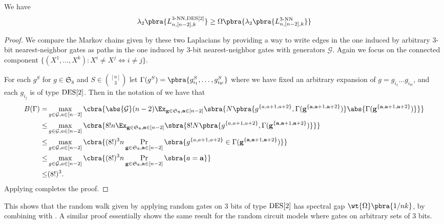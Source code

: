 \begin{lemma}\label{lem:any gate set comparison}
    We have
    \begin{align*}
        \lambda_2\pbra{L_{n,[n-2],k}^{3\text{-NN},\des{2}}}\geq \Omega\pbra{\lambda_2\pbra{L_{n,[n-2],k}^{3\text{-NN}}}}
    \end{align*}
\end{lemma}
\begin{proof}
    We compare the Markov chains given by these two Laplacians by providing a way to write edges in the one induced by arbitrary 3-bit nearest-neighbor gates as paths in the one induced by 3-bit nearest-neighbor gates with generators $\mathcal{G}$. Again we focus on the connected component $\{(X^1,\dots,X^{k}):X^i\neq X^j\iff i\neq j\}$.

    For each $g^S$ for $g\in\mathfrak{S}_8$ and $S\in \binom{[n]}{3}$ let $\Gamma(g^S)=\pbra{g_{i_1}^S,\dots,g_{i_{8!}}^S}$ where we have fixed an arbitrary expansion of $g=g_{i_1}\dots g_{i_{8!}}$, and each $g_{i_j}$ is of type $\mathrm{DES}[2]$. Then in the notation of  we have that
    \begin{align*}
        B(\Gamma)=&\max_{g\in \mathcal{G},a\in[n-2]}\cbra{\abs{\mathcal{G}}(n-2)\Ex_{\mathbf{g}\in \mathfrak{S}_{8},\mathbf{a}\in[n-2]}\sbra{N\pbra{g^{\{a,a+1,a+2\}},\Gamma(\mathbf{g}^{\{\mathbf a,\mathbf a+1,\mathbf a+2\}})}\abs{\Gamma(\mathbf{g}^{\{\mathbf a,\mathbf a+1,\mathbf a+2\}})}}}\\
        \leq &\max_{g\in \mathcal{G},a\in [n-2]}\cbra{8!n\Ex_{\mathbf{g}\in \mathfrak{S}_{8},\mathbf{a}\in[n-2]}\sbra{8!N\pbra{g^{\{a,a+1,a+2\}},\Gamma(\mathbf{g}^{\{\mathbf a,\mathbf a+1,\mathbf a+2\}})}}}\\
        \leq &\max_{g\in \mathcal{G},a\in [n-2]}\cbra{(8!)^3n\Pr_{\mathbf{g}\in \mathfrak{S}_{8},\mathbf{a}\in[n-2]}\sbra{g^{\{a,a+1,a+2\}}\in \Gamma(\mathbf{g}^{\{\mathbf a,\mathbf a+1,\mathbf a+2\}})}}\\
        \leq &\max_{g\in \mathcal{G},a\in [n-2]}\cbra{(8!)^3n\Pr_{\mathbf{g}\in \mathfrak{S}_{8},\mathbf{a}\in[n-2]}\sbra{a=\mathbf{a}}}\\
        \leq &(8!)^3.
    \end{align*}
    Applying  completes the proof.
\end{proof}


This shows that the random walk given by applying random gates on 3 bits of type $\mathrm{DES}[2]$ has spectral gap $\wt{\Omega}\pbra{1/nk}$, by combining with . A similar proof essentially shows the same result for the random circuit models where gates on arbitrary sets of 3 bits.




